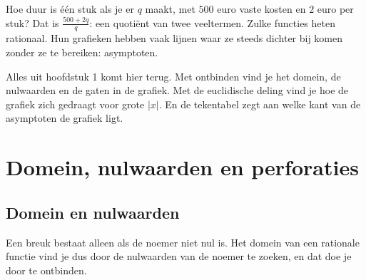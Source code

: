 %



Hoe duur is één stuk als je er $q$ maakt, met $500$ euro vaste kosten en $2$ euro per stuk? Dat is $\frac{500 + 2q}{q}$: een quotiënt van twee veeltermen. Zulke functies heten rationaal. Hun grafieken hebben vaak lijnen waar ze steeds dichter bij komen zonder ze te bereiken: asymptoten.

Alles uit hoofdstuk 1 komt hier terug. Met ontbinden vind je het domein, de nulwaarden en de gaten in de grafiek. Met de euclidische deling vind je hoe de grafiek zich gedraagt voor grote $|x|$. En de tekentabel zegt aan welke kant van de asymptoten de grafiek ligt.

\begin{oefeningen}[Start]

\end{oefeningen}

\section{Domein, nulwaarden en perforaties}

\subsection{Domein en nulwaarden}

Een breuk bestaat alleen als de noemer niet nul is. Het domein van een rationale functie vind je dus door de nulwaarden van de noemer te zoeken, en dat doe je door te ontbinden.

